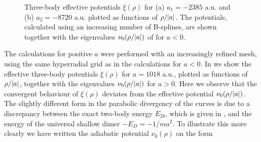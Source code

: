 \begin{figure}
	\centering  

	\caption{Three-body effective potentials $\xi(\rho)$ for (a) $a_1=-2385$ a.u. and (b) $a_2=-8720$ a.u. plotted as functions of $\rho/\lvert a\rvert$. The potentials, calculated using an increasing number of B-splines, are shown together with the eigenvalues $\nu_0(\rho/\lvert a\rvert)$ of  for $a<0$.}
	\label{fig:conv}
\end{figure}

The calculations for positive $a$ were performed with an increasingly refined mesh, using the same hyperradial grid as in the calculations for $a<0$. In  we show the effective three-body potentials $\xi(\rho)$ for $a=1018$ a.u., plotted as functions of $\rho/\lvert a\rvert$, together with the eigenvalues $\nu_0(\rho/\lvert a\rvert)$ for $a>0$. Here we observe that the convergent behaviour of $\xi(\rho)$ deviates from the effective potential $\nu_0(\rho/\lvert a\rvert)$. The slightly different form in the parabolic divergency of the curves is due to a discrepancy between the exact two-body energy $E_{2b}$, which is given in , and the energy of the universal shallow dimer $-E_D=-1/ma^2$. To illustrate this more clearly we have written the adiabatic potential $\nu_0(\rho)$ on the form  

